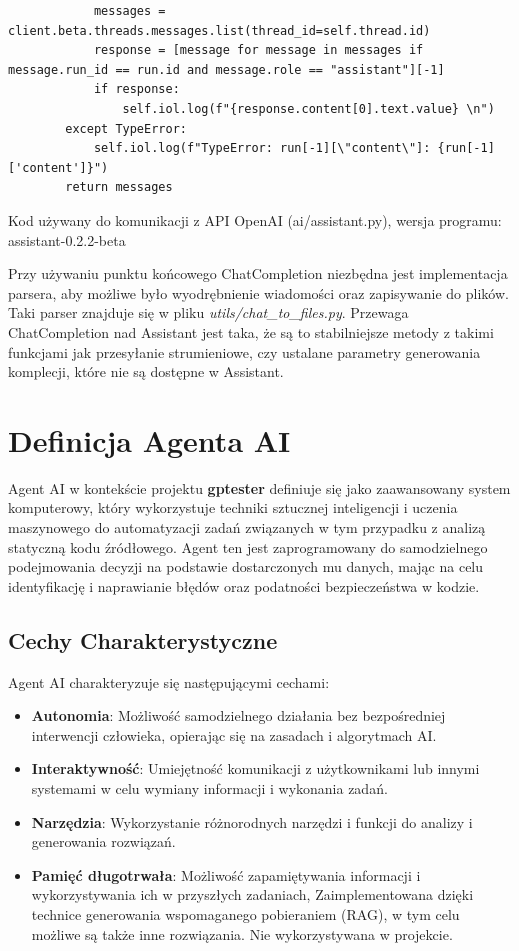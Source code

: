 \begin{listing}
\begin{verbatim}
            messages = client.beta.threads.messages.list(thread_id=self.thread.id)
            response = [message for message in messages if message.run_id == run.id and message.role == "assistant"][-1]
            if response:
                self.iol.log(f"{response.content[0].text.value} \n")
        except TypeError:
            self.iol.log(f"TypeError: run[-1][\"content\"]: {run[-1]['content']}")
        return messages
    \end{verbatim}
    \caption{Kod używany do komunikacji z API OpenAI (ai/assistant.py), wersja programu: assistant-0.2.2-beta}
    \label{lst:api_openai}
\end{listing}

\restoregeometry

Przy używaniu punktu końcowego ChatCompletion niezbędna jest implementacja parsera, aby możliwe było wyodrębnienie wiadomości oraz zapisywanie do plików. Taki parser znajduje się w pliku \textit{utils/chat\_to\_files.py}. Przewaga ChatCompletion nad Assistant jest taka, że są to stabilniejsze metody z takimi funkcjami jak przesyłanie strumieniowe, czy ustalane parametry generowania komplecji, które nie są dostępne w Assistant. 

\section{Definicja Agenta AI}
Agent AI w kontekście projektu \textbf{gptester} definiuje się jako zaawansowany system komputerowy, który wykorzystuje techniki sztucznej inteligencji i uczenia maszynowego do automatyzacji zadań związanych w tym przypadku z analizą statyczną kodu źródłowego. Agent ten jest zaprogramowany do samodzielnego podejmowania decyzji na podstawie dostarczonych mu danych, mając na celu identyfikację i naprawianie błędów oraz podatności bezpieczeństwa w kodzie.

\subsection{Cechy Charakterystyczne}

Agent AI charakteryzuje się następującymi cechami:

\begin{itemize}
    \item \textbf{Autonomia}: Możliwość samodzielnego działania bez bezpośredniej interwencji człowieka, opierając się na zasadach i algorytmach AI.
    \item \textbf{Interaktywność}: Umiejętność komunikacji z użytkownikami lub innymi systemami w celu wymiany informacji i wykonania zadań.
    \item \textbf{Narzędzia}: Wykorzystanie różnorodnych narzędzi i funkcji do analizy i generowania rozwiązań.
    \item \textbf{Pamięć długotrwała}: Możliwość zapamiętywania informacji i wykorzystywania ich w przyszłych zadaniach, Zaimplementowana dzięki technice generowania wspomaganego pobieraniem (RAG), w tym celu możliwe są także inne rozwiązania. Nie wykorzystywana w projekcie.
\end{itemize}

